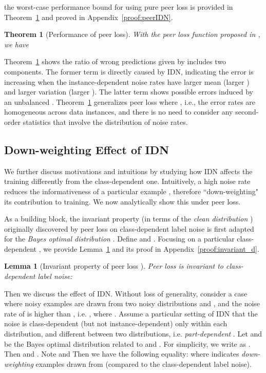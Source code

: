 \documentclass[final]{cvpr}
\newtheorem{theorem}{Theorem}
\newtheorem{lemma}{Lemma}
\newcommand{\rev}[1]{{\color{blue}#1}}
\newcommand{\rev}[1]{#1}
\begin{document}
the worst-case performance bound for using pure peer loss is provided in Theorem~\ref{thm:peerIDN} and proved in Appendix~\ref{proof:peerIDN}.

\begin{theorem}[Performance of peer loss]\label{thm:peerIDN}
With the peer loss function proposed in \cite{liu2019peer}, we have

\end{theorem}
Theorem~\ref{thm:peerIDN} shows the ratio of wrong predictions given by  includes two components. The former term  is directly caused by IDN, indicating the error is increasing when the instance-dependent noise rates have larger mean (larger ) and larger \rev{variation} (larger ).
The latter term  shows possible errors induced by an unbalanced .
Theorem~\ref{thm:peerIDN} generalizes peer loss where , i.e., the error rates are homogeneous across data instances, and there is no need to consider any second-order statistics that involve the distribution of noise rates.

\subsection{Down-weighting Effect of IDN}\label{sec:down-weight}

\rev{We further discuss motivations and intuitions by studying}
how IDN affects the training differently from the class-dependent one. Intuitively, a high noise rate reduces the informativeness of a particular example , therefore ``down-weighting" its contribution to training. We now analytically show this under peer loss. 

As a building block, the invariant property (in terms of the \textit{clean distribution }) originally discovered by peer loss on class-dependent label noise is first adapted for the \textit{Bayes optimal distribution }. Define  and .
Focusing on a particular class-dependent , we provide Lemma~\ref{lem:invariant_d} and its proof in Appendix~\ref{proof:invariant_d}.
\begin{lemma}[Invariant property of peer loss \cite{liu2019peer}]\label{lem:invariant_d}
Peer loss is invariant to class-dependent label noise:
{\small }
\end{lemma}

Then we discuss the effect of IDN.
Without loss of generality, consider a case where noisy examples are drawn from two noisy distributions  and , and the noise rate of  is higher than , i.e. , where . \rev{Assume a particular setting of IDN that the noise is class-dependent (but not instance-dependent) only within each distribution, and different between two distributions, i.e. \textit{part-dependent} \cite{xia2020parts}.}
Let  and  be the Bayes optimal distribution related to  and . 
For simplicity, we write  as .
Then  and .
Note  and  Then we have the following equality:
{
}
where  indicates \emph{down-weighting} examples drawn from  (compared to the class-dependent label noise).
\end{document}
